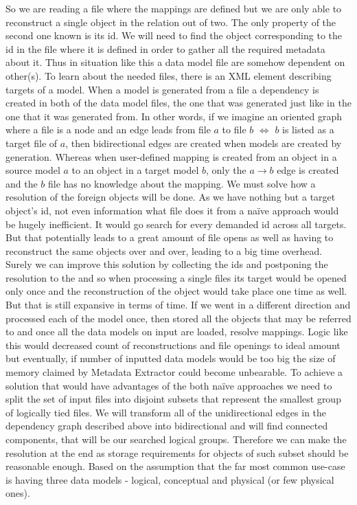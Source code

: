 So we are reading a file where the mappings are defined but we are only able to reconstruct a single object in the relation out of two. 
The only property of the second one known is its id. We will need to find the object corresponding to the id in the file where it is defined in order to gather all the required metadata about it.
Thus in situation like this a data model file are somehow dependent on other(s).
To learn about the needed files, there is an XML element describing targets of a model.
When a model is generated from a file a dependency is created in both of the data model files, the one that was generated just like in the one that it was generated from. In other words, if we imagine an oriented graph where a file is a node and an edge leads from file $a$ to file $b$ $\iff$ $b$ is listed as a target file of $a$, then bidirectional edges are created when models are created by generation.
Whereas when user-defined mapping is created from an object in a source model $a$ to an object in a target model $b$, only the $a \rightarrow b$ edge is created and the $b$ file has no knowledge about the mapping.
We must solve how a resolution of the foreign objects will be done. As we have nothing but a target object's id, not even information what file does it from a naïve approach would be hugely inefficient. 
It would go search for every demanded id across all targets. 
But that potentially leads to a great amount of file opens as well as having to reconstruct the same objects over and over, leading to a big time overhead.
Surely we can improve this solution by collecting the ids and postponing the resolution to the and so when processing a single files its target would be opened only once and the reconstruction of the object would take place one time as well. But that is still expansive in terms of time.
If we went in a different direction and processed each of the model once, then stored all the objects that may be referred to and once all the data models on input are loaded, resolve mappings. Logic like this would decreased count of reconstructions and file openings to ideal amount but eventually, if number of inputted data models would be too big the size of memory claimed by Metadata Extractor could become unbearable.
To achieve a solution that would have advantages of the both naïve approaches we need to split the set of input files into disjoint subsets that represent the smallest group of logically tied files. We will transform all of the unidirectional edges in the dependency graph described above into bidirectional and will find connected components, that will be our searched logical groups. Therefore we can make the resolution at the end as storage requirements for objects of such subset should be reasonable enough. Based on the assumption that the far most common use-case is having three data models - logical, conceptual and physical (or few physical ones). \\

